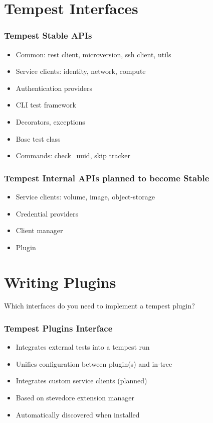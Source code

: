 \documentclass[aspectratio=169,11pt,hyperref={colorlinks=true}]{beamer}
\begin{document}
\section{Tempest Interfaces}
\begin{frame}
    \frametitle{Tempest Stable APIs}
    \begin{itemize}
        \item{Common: rest client, microversion, ssh client, utils}
        \item{Service clients: identity, network, compute}
        \item{Authentication providers}
        \item{CLI test framework}
        \item{Decorators, exceptions}
        \item{Base test class}
        \item{Commands: check\_uuid, skip tracker}
    \end{itemize}
\end{frame}

\begin{frame}
    \frametitle{Tempest Internal APIs planned to become Stable}
    \begin{itemize}
        \item{Service clients: volume, image, object-storage}
        \item{Credential providers}
        \item{Client manager}
        \item{Plugin}
    \end{itemize}
\end{frame}

\section{Writing Plugins}
\begin{frame}[c]
    \begin{center}
        \large Which interfaces do you need to implement a tempest plugin?
    \end{center}
\end{frame}

\begin{frame}
    \frametitle{Tempest Plugins Interface}
    \begin{itemize}
        \item Integrates external tests into a tempest run
        \item Unifies configuration between plugin(s) and in-tree
        \item Integrates custom service clients (planned)
    \end{itemize}
    \begin{itemize}
    	\item{Based on stevedore extension manager}
    	\item{Automatically discovered when installed}
    \end{itemize}
\end{frame}
\end{document}
